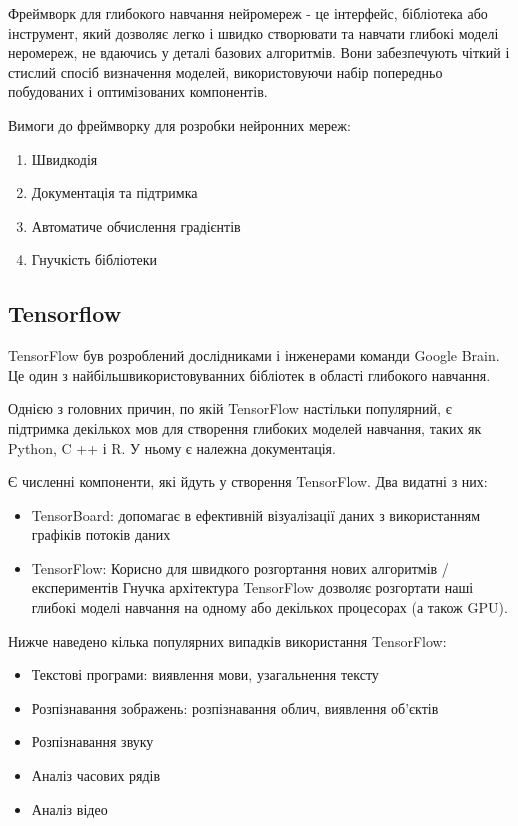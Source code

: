 Фреймворк для глибокого навчання нейромереж - це інтерфейс, бібліотека або інструмент, який дозволяє легко і швидко створювати та навчати глибокі моделі неромереж, не вдаючись у деталі базових алгоритмів. Вони забезпечують чіткий і стислий спосіб визначення моделей, використовуючи набір попередньо побудованих і оптимізованих компонентів.

Вимоги до фреймворку для розробки нейронних мереж:

\begin{enumerate}
    \item Швидкодія
    \item Документація та підтримка 
    \item Автоматиче обчислення градієнтів
    \item Гнучкість бібліотеки
\end{enumerate}

\subsection{Tensorflow}
TensorFlow був розроблений дослідниками і інженерами команди Google Brain. Це один з найбільшвикористовуванних бібліотек в області глибокого навчання. 

Однією з головних причин, по якій TensorFlow настільки популярний, є підтримка декількох мов для створення глибоких моделей навчання, таких як Python, C ++ і R. У ньому є належна документація.

Є численні компоненти, які йдуть у створення TensorFlow. Два видатні з них:
\begin{itemize}
    \item TensorBoard: допомагає в ефективній візуалізації даних з використанням графіків потоків даних
    \item TensorFlow: Корисно для швидкого розгортання нових алгоритмів / експериментів Гнучка архітектура TensorFlow дозволяє розгортати наші глибокі моделі навчання на одному або декількох процесорах (а також GPU). 
\end{itemize}

Нижче наведено кілька популярних випадків використання TensorFlow:

\begin{itemize}
    \item Текстові програми: виявлення мови, узагальнення тексту
    \item Розпізнавання зображень: розпізнавання облич, виявлення об'єктів
    \item Розпізнавання звуку
    \item Аналіз часових рядів
    \item Аналіз відео
\end{itemize}

